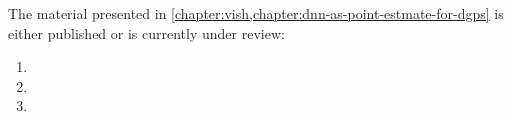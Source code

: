 The material presented in \cref{chapter:vish,chapter:dnn-as-point-estmate-for-dgps} is either published or is currently under review:
\begin{enumerate}
    \item {}
    \item {}
    \item {}
\end{enumerate}





